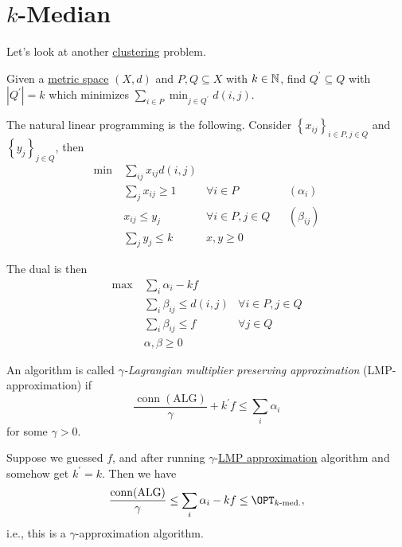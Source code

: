 \section{\(k\)-Median}

Let's look at another \hyperref[prb:clustering]{clustering} problem.

\begin{problem}[\(k\)-median]\label{prb:k-median}
Given a \hyperref[def:metric]{metric space} \((X, d)\) and \(P, Q\subseteq X\) with \(k\in \mathbb{\MakeUppercase{n}} \), find \(Q^\prime \subseteq Q\) with \(\left\vert Q^\prime  \right\vert = k\) which minimizes \(\sum_{i\in P} \min _{j\in Q^\prime } d(i, j)\).
\end{problem}

The natural linear programming is the following. Consider \(\left\{ x_{ij}  \right\}_{i\in P, j\in Q} \) and \(\left\{ y_j \right\}_{j\in Q} \), then
\begin{align*}
	\min~ & \sum_{ij} x_{ij} d(i, j)                                             \\
	      & \sum_{j} x_{ij} \geq 1   & \forall i\in P         &  & (\alpha _i)   \\
	      & x_{ij} \leq y_j          & \forall i\in P, j\in Q &  & (\beta _{ij}) \\
	      & \sum_{j} y_j \leq k
	      & x, y\geq 0
\end{align*}

The dual is then
\begin{align*}
	\max~ & \sum_{i} \alpha _i - kf                                    \\
	      & \sum_{i} \beta _{ij} \leq d(i, j) & \forall i\in P, j\in Q \\
	      & \sum_{i} \beta _{ij} \leq f       & \forall j\in Q         \\
	      & \alpha , \beta \geq 0
\end{align*}

\begin{definition}\label{def:LMP}
	An algorithm is called \emph{\(\gamma \)-Lagrangian multiplier preserving approximation} (LMP-approximation) if
	\[
		\frac{\mathop{\mathrm{conn}}(\text{ALG})}{\gamma }+ k^\prime f \leq \sum_{i} \alpha _i
	\]
	for some \(\gamma > 0\).
\end{definition}

\begin{remark}
	Suppose we guessed \(f\), and after running \(\gamma\)-\hyperref[def:LMP]{LMP approximation} algorithm and somehow get \(k^\prime = k\). Then we have
	\[
		\frac{\mathop{\mathrm{conn}}(\mathrm{ALG})}{\gamma } \leq \sum_{i} \alpha _i - kf \leq \OPT_{\text{\(k\)-med.}},
	\]
	i.e., this is a \(\gamma \)-approximation algorithm.
\end{remark}

